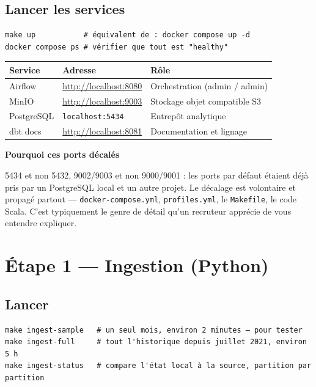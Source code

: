 \documentclass[11pt,a4paper]{article}
\newcommand{\cmd}[1]{\texttt{\small #1}}
\newcommand{\titrebloc}[1]{\textbf{\color{encre}#1}\par\vspace{0.25em}}
\begin{document}
\subsection{Lancer les services}

\begin{lstlisting}[style=sh]
make up           # équivalent de : docker compose up -d
docker compose ps # vérifier que tout est "healthy"
\end{lstlisting}

\begin{center}
\begin{tabularx}{\textwidth}{@{}llX@{}}
\toprule
\textbf{Service} & \textbf{Adresse} & \textbf{Rôle} \\
\midrule
Airflow    & \url{http://localhost:8080} & Orchestration (admin / admin) \\
MinIO      & \url{http://localhost:9003} & Stockage objet compatible S3 \\
PostgreSQL & \cmd{localhost:5434}        & Entrepôt analytique \\
dbt docs   & \url{http://localhost:8081} & Documentation et lignage \\
\bottomrule
\end{tabularx}
\end{center}

\begin{attention}
\titrebloc{Pourquoi ces ports décalés}
5434 et non 5432, 9002/9003 et non 9000/9001 : les ports par défaut étaient
déjà pris par un PostgreSQL local et un autre projet. Le décalage est
volontaire et propagé partout — \cmd{docker-compose.yml},
\cmd{profiles.yml}, le \cmd{Makefile}, le code Scala. C'est typiquement le
genre de détail qu'un recruteur apprécie de vous entendre expliquer.
\end{attention}

\newpage
\section{Étape 1 — Ingestion (Python)}

\subsection{Lancer}

\begin{lstlisting}[style=sh]
make ingest-sample   # un seul mois, environ 2 minutes — pour tester
make ingest-full     # tout l'historique depuis juillet 2021, environ 5 h
make ingest-status   # compare l'état local à la source, partition par partition
\end{lstlisting}
\end{document}
